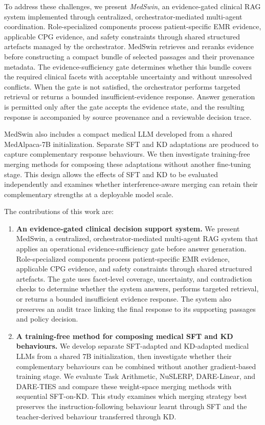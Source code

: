 \documentclass[conference]{IEEEtran}
\begin{document}
To address these challenges, we present \emph{MedSwin}, an evidence-gated clinical RAG system implemented through centralized, orchestrator-mediated multi-agent coordination. Role-specialized components process patient-specific EMR evidence, applicable CPG evidence, and safety constraints through shared structured artefacts managed by the orchestrator. MedSwin retrieves and reranks evidence before constructing a compact bundle of selected passages and their provenance metadata. The evidence-sufficiency gate determines whether this bundle covers the required clinical facets with acceptable uncertainty and without unresolved conflicts. When the gate is not satisfied, the orchestrator performs targeted retrieval or returns a bounded insufficient-evidence response. Answer generation is permitted only after the gate accepts the evidence state, and the resulting response is accompanied by source provenance and a reviewable decision trace.

MedSwin also includes a compact medical LLM developed from a shared MedAlpaca-7B initialization. Separate SFT and KD adaptations are produced to capture complementary response behaviours. We then investigate training-free merging methods for composing these adaptations without another fine-tuning stage. This design allows the effects of SFT and KD to be evaluated independently and examines whether interference-aware merging can retain their complementary strengths at a deployable model scale.

The contributions of this work are:

\begin{enumerate}
    \item \textbf{An evidence-gated clinical decision support system.}
    We present MedSwin, a centralized, orchestrator-mediated multi-agent RAG system that applies an operational evidence-sufficiency gate before answer generation. Role-specialized components process patient-specific EMR evidence, applicable CPG evidence, and safety constraints through shared structured artefacts. The gate uses facet-level coverage, uncertainty, and contradiction checks to determine whether the system answers, performs targeted retrieval, or returns a bounded insufficient evidence response. The system also preserves an audit trace linking the final response to its supporting passages and policy decision.

    \item \textbf{A training-free method for composing medical SFT and KD behaviours.}
    We develop separate SFT-adapted and KD-adapted medical LLMs from a shared 7B initialization, then investigate whether their complementary behaviours can be combined without another gradient-based training stage. We evaluate Task Arithmetic, NuSLERP, DARE-Linear, and DARE-TIES and compare these weight-space merging methods with sequential SFT-on-KD. This study examines which merging strategy best preserves the instruction-following behaviour learnt through SFT and the teacher-derived behaviour transferred through KD.
\end{enumerate}
\end{document}
